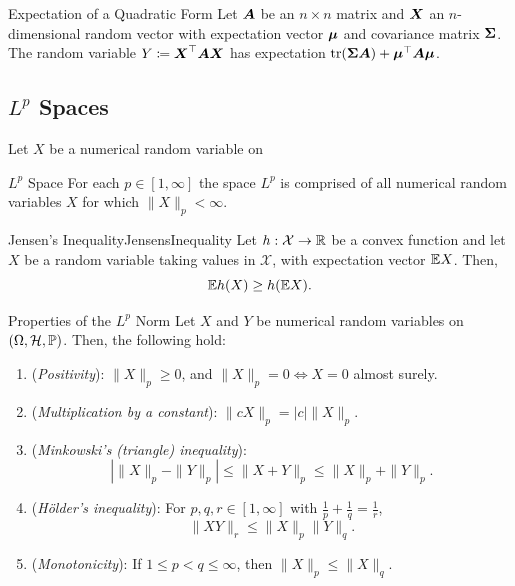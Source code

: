 \begin{prop}{Expectation of a Quadratic Form}{}
	Let $\boldsymbol{A}$ be an $n \times n$ matrix and $\boldsymbol{X}$ an $n$-dimensional random vector with expectation vector $\boldsymbol{\mu}$ and covariance matrix $\boldsymbol{\Sigma}$. The random variable $Y \coloneqq \boldsymbol{X}^{\top} \boldsymbol{A} \boldsymbol{X}$ has expectation $\mathrm{tr}(\boldsymbol{\Sigma} \boldsymbol{A}) + \boldsymbol{\mu}^{\top} \boldsymbol{A} \boldsymbol{\mu}$.
\end{prop}

\subsection{$L^p$ Spaces}
Let $X$ be a numerical random variable on

\begin{defn}{$L^p$ Space}{}
	For each $p \in [1, \infty]$ the space $L^p$ is comprised of all numerical random variables $X$ for which $\|X\|_p < \infty$.
\end{defn}

\begin{lem}{Jensen's Inequality}{JensensInequality}
	Let $h : \mathcal{X} \to \mathbb{R}$ be a convex function and let $X$ be a random variable taking values in $\mathcal{X}$, with expectation vector $\mathbb{E} X$. Then,
	\begin{equation*}
		\mathbb{E} h(X) \ge h(\mathbb{E} X).
	\end{equation*}
\end{lem}

\begin{thm}{Properties of the $L^p$ Norm}{}
	Let $X$ and $Y$ be numerical random variables on $(\Omega, \mathcal{H}, \mathbb{P})$. Then, the following hold:
	\begin{enumerate}
		\item (\textit{Positivity}): $\|X\|_p \ge 0$, and $\|X\|_p = 0 \iff X = 0$ almost surely.
		\item (\textit{Multiplication by a constant}): $\|c X\|_p = |c| \|X\|_p$.
		\item (\textit{Minkowski's (triangle) inequality}):
		      \begin{equation*}
			      |\|X\|_p - \|Y\|_p| \le \|X + Y\|_p \le \|X\|_p + \|Y\|_p.
		      \end{equation*}
		\item (\textit{Hölder's inequality}): For $p, q, r \in [1, \infty]$ with $\frac{1}{p} + \frac{1}{q} = \frac{1}{r}$,
		      \begin{equation}
			      \|XY\|_r \le \|X\|_p \|Y\|_q.
			      \label{eq:HoldersInequality}
		      \end{equation}
		\item (\textit{Monotonicity}): If $1 \le p < q \le \infty$, then $\|X\|_p \le \|X\|_q$.
	\end{enumerate}
\end{thm}

